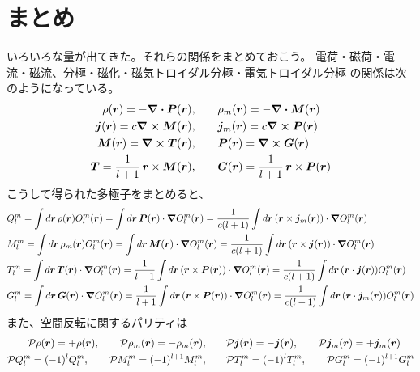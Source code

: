\documentclass[../../master.tex]{subfiles}
\begin{document}
\section{まとめ}
いろいろな量が出てきた。それらの関係をまとめておこう。
電荷・磁荷・電流・磁流、分極・磁化・磁気トロイダル分極・電気トロイダル分極
の関係は次のようになっている。
\begin{align}
    \rho(\vb*{r}) = -\div \vb*{P}(\vb*{r}), \quad & \quad \rho_m(\vb*{r}) = -\div \vb*{M}(\vb*{r})\\
    \vb*{j}(\vb*{r}) = c\curl \vb*{M}(\vb*{r}), \quad & \quad \vb*{j}_m(\vb*{r}) = c \curl \vb*{P}(\vb*{r})\\
    \vb*{M}(\vb*{r}) = \curl \vb*{T}(\vb*{r}), \quad & \quad \vb*{P}(\vb*{r}) = \curl \vb*{G}(\vb*{r})\\
    \vb*{T} = \frac{1}{l+1}\, \vb*{r}\times\vb*{M}(\vb*{r}), \quad & \quad \vb*{G}(\vb*{r}) = \frac{1}{l+1}\, \vb*{r}\times\vb*{P}(\vb*{r})
\end{align}
こうして得られた多極子をまとめると、
\begin{align}
    &Q_l^m
    = \int d\vb*{r}\, \rho(\vb*{r})O_l^m(\vb*{r})
    = \int d\vb*{r}\, \vb*{P}(\vb*{r}) \cdot \grad O_l^m(\vb*{r})
    = \frac{1}{c(l+1)}\int d\vb*{r}\, (\vb*{r}\times \vb*{j}_m(\vb*{r})) \cdot \grad O_l^m(\vb*{r})\\
    &M_l^m
    = \int d\vb*{r}\, \rho_m(\vb*{r})O_l^m(\vb*{r})
    = \int d\vb*{r}\, \vb*{M}(\vb*{r}) \cdot \grad O_l^m(\vb*{r})
    = \frac{1}{c(l+1)}\int d\vb*{r}\, (\vb*{r}\times \vb*{j}(\vb*{r})) \cdot \grad O_l^m(\vb*{r})\\
    &T_l^m
    = \int d\vb*{r}\, \vb*{T}(\vb*{r})\cdot \grad O_l^m(\vb*{r})
    = \frac{1}{l+1}\int d\vb*{r}\, (\vb*{r} \times \vb*{P}(\vb*{r}))\cdot \grad O_l^m(\vb*{r})
    = \frac{1}{c(l+1)}\int d\vb*{r}\, (\vb*{r}\cdot \vb*{j}(\vb*{r})) O_l^m(\vb*{r})\\
    &G_l^m
    = \int d\vb*{r}\, \vb*{G}(\vb*{r})\cdot \grad O_l^m(\vb*{r})
    = \frac{1}{l+1}\int d\vb*{r}\, (\vb*{r} \times \vb*{P}(\vb*{r}))\cdot \grad O_l^m(\vb*{r})
    = \frac{1}{c(l+1)}\int d\vb*{r}\, (\vb*{r}\cdot \vb*{j}_m(\vb*{r})) O_l^m(\vb*{r})
\end{align}
また、空間反転に関するパリティは
\begin{align}
    \mathcal{P} \rho(\vb*{r}) = + \rho(\vb*{r}), \qquad
    \mathcal{P} \rho_m(\vb*{r}) = - \rho_m(\vb*{r}), \qquad&
    \mathcal{P} \vb*{j}(\vb*{r}) = - \vb*{j}(\vb*{r}), \qquad
    \mathcal{P} \vb*{j}_m(\vb*{r}) = + \vb*{j}_m(\vb*{r})\\
    \mathcal{P}Q_l^m = (-1)^{l}Q_l^m,\qquad
    \mathcal{P}M_l^m = (-1)^{l+1}M_l^m,\qquad&
    \mathcal{P}T_l^m = (-1)^{l}T_l^m,\qquad
    \mathcal{P}G_l^m = (-1)^{l+1}G_l^m
\end{align}
\end{document}
